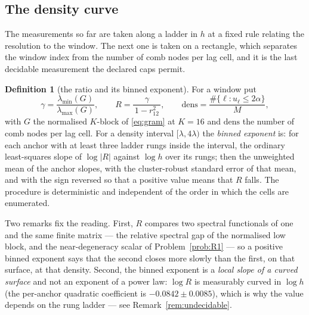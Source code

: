 \documentclass[11pt,a4paper]{article}
\theoremstyle{plain}
\theoremstyle{definition}
\newtheorem{definition}[theorem]{Definition}
\newcommand{\lmin}{\lambda_{\min}}
\newcommand{\lmax}{\lambda_{\max}}
\begin{document}
\subsection{The density curve}
\label{sec:density}

The measurements so far are taken along a ladder in $h$ at a fixed rule
relating the resolution to the window. The next one is taken on a rectangle,
which separates the window index from the number of comb nodes per lag cell,
and it is the last decidable measurement the declared caps permit.

\begin{definition}[the ratio and its binned exponent]
\label{def:ratio}
For a window put
\begin{equation}
\label{eq:ratio}
  \gamma=\frac{\lmin(G)}{\lmax(G)},
  \qquad
  R=\frac{\gamma}{\,1-r_{12}^{2}\,},
  \qquad
  \mathrm{dens}=\frac{\#\{\ell:u_\ell\le2\alpha\}}{M},
\end{equation}
with $G$ the normalised $K$-block of \eqref{eq:gram} at $K=16$ and
$\mathrm{dens}$ the number of comb nodes per lag cell. For a density interval
$[\lambda,4\lambda)$ the \emph{binned exponent} is: for each anchor with at
least three ladder rungs inside the interval, the ordinary least-squares slope
of $\log|R|$ against $\log h$ over its rungs; then the unweighted mean of the
anchor slopes, with the cluster-robust standard error of that mean, and with the
sign reversed so that a positive value means that $R$ falls. The procedure is
deterministic and independent of the order in which the cells are enumerated.
\end{definition}

Two remarks fix the reading. First, $R$ compares two spectral functionals of one
and the same finite matrix --- the relative spectral gap of the normalised low
block, and the near-degeneracy scalar of Problem~\ref{prob:R1} --- so a positive
binned exponent says that the second closes more slowly than the first, on that
surface, at that density. Second, the binned exponent is a \emph{local slope of
a curved surface} and not an exponent of a power law: $\log R$ is measurably
curved in $\log h$ (the per-anchor quadratic coefficient is
$-0.0842\pm0.0085$), which is why the value depends on the rung ladder ---
see Remark~\ref{rem:undecidable}.
\end{document}
